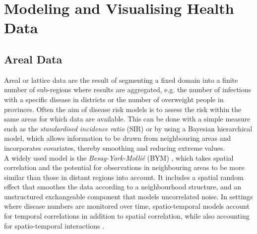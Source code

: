 \clearpage
\section{Modeling and Visualising Health Data}
\subsection{Areal Data}
Areal or lattice data are the result of segmenting a fixed domain into a finite number of sub-regions where results are aggregated, e.g. the number of infections with a specific disease in districts or the number of overweight people in provinces. Often the aim of disease risk models is to assess the risk within the same areas for which data are available. This can be done with a simple measure such as the \textit{standardised incidence ratio} (SIR) or by using a Bayesian hierarchical model, which allows information to be drawn from neighbouring areas and incorporates covariates, thereby smoothing and reducing extreme values. \\
A widely used model is the \textit{Besag-York-Mollié} (BYM) \autocite[][]{besag1991bayesian}, which takes spatial correlation and the potential for observations in neighbouring areas to be more similar than those in distant regions into account. It includes a spatial random effect that smoothes the data according to a neighbourhood structure, and an unstructured exchangeable component that models uncorrelated noise. In settings where disease numbers are monitored over time, spatio-temporal models account for temporal correlations in addition to spatial correlation, while also accounting for spatio-temporal interactions  \autocite[][]{moraga2019geospatial}.
